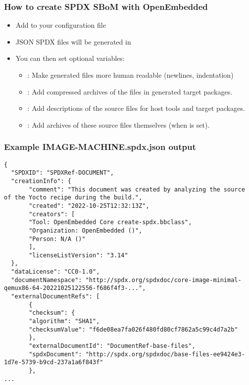 \begin{frame}[fragile]
  \frametitle{How to create SPDX SBoM with OpenEmbedded}
  \begin{itemize}
     \item Add  to your configuration file
     \item JSON SPDX files will be generated in 
     \item You can then set optional variables:
           \begin{itemize}
	      \item {}:
		    Make generated files more human readable (newlines, indentation)
	      \item {}:
		    Add compressed archives of the files in generated target packages.
	      \item {}:
		    Add descriptions of the source files for host tools and target packages.
	      \item {}:
		    Add archives of these source files themselves (when  is set).
           \end{itemize}
  \end{itemize}
\end{frame}

\begin{frame}[fragile]
  \frametitle{Example IMAGE-MACHINE.spdx.json output}
  \begin{block}{}
    \fontsize{7}{7}\selectfont
    \begin{verbatim}
{
  "SPDXID": "SPDXRef-DOCUMENT",
  "creationInfo": {
       "comment": "This document was created by analyzing the source of the Yocto recipe during the build.",
       "created": "2022-10-25T12:32:13Z",
       "creators": [
       "Tool: OpenEmbedded Core create-spdx.bbclass",
       "Organization: OpenEmbedded ()",
       "Person: N/A ()"
       ],
       "licenseListVersion": "3.14"
  },
  "dataLicense": "CC0-1.0",
  "documentNamespace": "http://spdx.org/spdxdoc/core-image-minimal-qemux86-64-20221025122556-f686f4f3-...",
  "externalDocumentRefs": [
       {
       "checksum": {
       "algorithm": "SHA1",
       "checksumValue": "f6de08ea7fa026f480fd80cf7862a5c99c4d7a2b"
       },
       "externalDocumentId": "DocumentRef-base-files",
       "spdxDocument": "http://spdx.org/spdxdoc/base-files-ee9424e3-1d7e-5739-b9cd-237a1a6f843f"
       },
...
    \end{verbatim}
  \end{block}
\end{frame}

